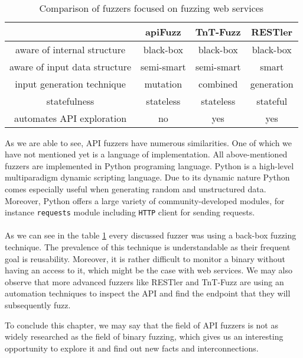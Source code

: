 \paragraph{}
\begin{table}[h]
\begin{center}
\begin{tabular}{|c|c c c|}
\hline
                              & apiFuzz    & TnT-Fuzz   & RESTler    \\
\hline
aware of internal structure   & black-box  & black-box  & black-box  \\
aware of input data structure & semi-smart & semi-smart & smart      \\
input generation technique    & mutation   & combined   & generation \\
statefulness                 & stateless  & stateless  & stateful  \\
automates API exploration     & no         & yes        & yes        \\
\hline
\end{tabular}
\caption{Comparison of fuzzers focused on fuzzing web services}
\label{table:fuzzers-comparison}
\end{center}
\end{table}

As we are able to see, API fuzzers have numerous similarities. One of which we have not mentioned yet is a language of implementation. All above-mentioned fuzzers are implemented in Python programing language. Python is a high-level multiparadigm dynamic scripting language. Due to its dynamic nature Python comes especially useful when generating random and unstructured data. Moreover, Python offers a large variety of community-developed modules, for instance \texttt{requests} module including \texttt{HTTP} client for sending requests.

\paragraph{}
As we can see in the table \ref{table:fuzzers-comparison} every discussed fuzzer was using a back-box fuzzing technique. The prevalence of this technique is understandable as their frequent goal is reusability. Moreover, it is rather difficult to monitor a binary without having an access to it, which might be the case with web services. We may also observe that more advanced fuzzers like RESTler and TnT-Fuzz are using an automation techniques to inspect the API and find the endpoint that they will subsequently fuzz.

To conclude this chapter, we may say that the field of API fuzzers is not as widely researched as the field of binary fuzzing, which gives us an interesting opportunity to explore it and find out new facts and interconnections.
